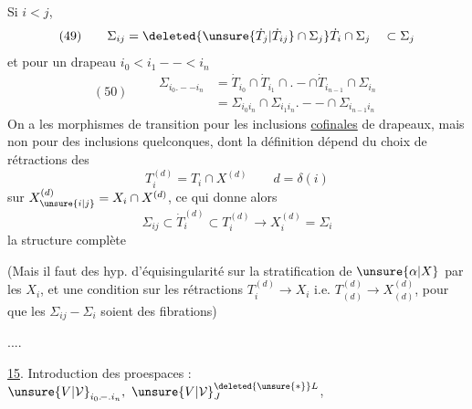 Si $i<j$, 
\[
(49)\qquad\Sigma_{ij}=\deleted{\unsure{\dot T_j|\dot T_{ij}}\cap\Sigma_j}
\dot T_i\cap\Sigma_j\quad\subset\Sigma_j
\]
et pour un drapeau $i_0<i_1--<i_n$
\[
(50)\qquad\begin{aligned}
\Sigma_{i_0.--i_n}&=\dot T_{i_0}\cap\dot T_{i_1}\cap .-\cap
\dot T_{i_{n-1}}\cap\Sigma_{i_n}\\
&=\Sigma_{i_0i_n}\cap\Sigma_{i_1i_n}.--\cap\Sigma_{i_{n-1}i_n}
\end{aligned}
\]
On a  les morphismes de transition
 pour les
 inclusions \uline{cofinales} de drapeaux,
mais non pour des inclusions quelconques, dont la définition dépend
du choix de rétractions des
\[
T_i^{(d)}=T_i\cap X^{(d)}\qquad d=\delta(i)
\]
sur $X_{\unsure{i|j}}^{(d)}=X_i\cap X^{(d)}$, ce qui donne alors
\[
\Sigma_{ij}\subset\dot T_i^{(d)}\subset T_i^{(d)}
\longrightarrow X_i^{(d)}=\Sigma_i
\]
la structure complète

(Mais il faut des hyp. d'équisingularité sur la
 stratification de $\unsure{\alpha|X}$ par les $X_i$,
et une condition 
sur les rétractions
$T_i^{(d)}\longrightarrow X_i$ i.e. 
$T_{(d)}^{(d)}\longrightarrow X_{(d)}^{(d)}$,
pour que les $\Sigma_{ij}\mathrel{-}\Sigma_i$ soient des fibrations)

....

\uline{15}. Introduction des proespaces :
${\unsure{V|\mathcal V}}_{i_0.\!-.i_n},\ {\unsure{V|\mathcal V}}_J^{\deleted{\unsure{*}}L}$,

